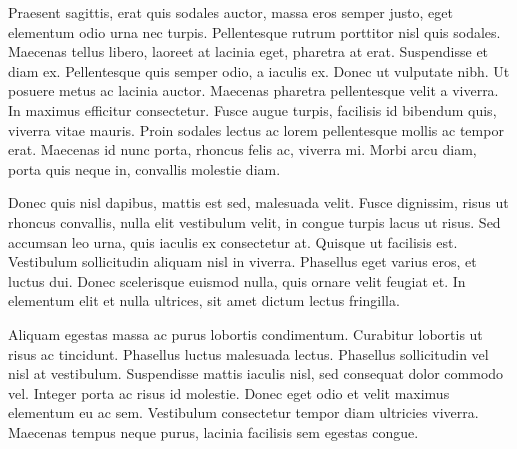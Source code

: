Praesent sagittis, erat quis sodales auctor, massa eros semper justo, eget elementum odio urna nec turpis. Pellentesque rutrum porttitor nisl quis sodales. Maecenas tellus libero, laoreet at lacinia eget, pharetra at erat. Suspendisse et diam ex. Pellentesque quis semper odio, a iaculis ex. Donec ut vulputate nibh. Ut posuere metus ac lacinia auctor. Maecenas pharetra pellentesque velit a viverra. In maximus efficitur consectetur. Fusce augue turpis, facilisis id bibendum quis, viverra vitae mauris. Proin sodales lectus ac lorem pellentesque mollis ac tempor erat. Maecenas id nunc porta, rhoncus felis ac, viverra mi. Morbi arcu diam, porta quis neque in, convallis molestie diam.

Donec quis nisl dapibus, mattis est sed, malesuada velit. Fusce dignissim, risus ut rhoncus convallis, nulla elit vestibulum velit, in congue turpis lacus ut risus. Sed accumsan leo urna, quis iaculis ex consectetur at. Quisque ut facilisis est. Vestibulum sollicitudin aliquam nisl in viverra. Phasellus eget varius eros, et luctus dui. Donec scelerisque euismod nulla, quis ornare velit feugiat et. In elementum elit et nulla ultrices, sit amet dictum lectus fringilla.

Aliquam egestas massa ac purus lobortis condimentum. Curabitur lobortis ut risus ac tincidunt. Phasellus luctus malesuada lectus. Phasellus sollicitudin vel nisl at vestibulum. Suspendisse mattis iaculis nisl, sed consequat dolor commodo vel. Integer porta ac risus id molestie. Donec eget odio et velit maximus elementum eu ac sem. Vestibulum consectetur tempor diam ultricies viverra. Maecenas tempus neque purus, lacinia facilisis sem egestas congue.